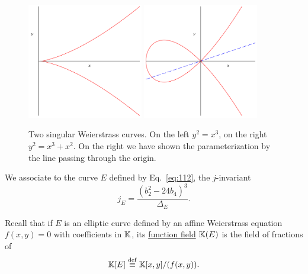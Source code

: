 \begin{figure}[ht]
  \centering
  \includegraphics[width=0.45\textwidth]{isogeny/cusp}
  \includegraphics[width=0.45\textwidth]{isogeny/node}
  \caption{Two singular Weierstrass curves. On the left $y^2=x^3$, on
    the right $y^2=x^3+x^2$. On the right we have shown the
    parameterization by the line passing through the origin.}
  \label{fig:singular}
\end{figure}

\begin{definition}[$j$-invariant]
  We associate to the curve $E$ defined by Eq.~\eqref{eq:112}, the
  $j$-invariant
 \[j_E = \frac{(b_2^2-24b_4)^3}{\Delta_E}\text{.}\]
\end{definition}

\begin{nota}
  Recall that if $E$ is an elliptic curve defined by an affine
  Weierstrass equation $f(x,y)=0$ with coefficients in $\mathbb{K}$, its
  \hyperref[sec:algebraic-varieties]{function field} $\mathbb{K}(E)$ is the
  field of fractions of
  \begin{equation}
    \label{eq:125}
    \mathbb{K}[E]\overset{\mathrm{def}}{\equiv}\mathbb{K}[x,y]/(f(x,y))
    \text{.}
  \end{equation}
\end{nota}


